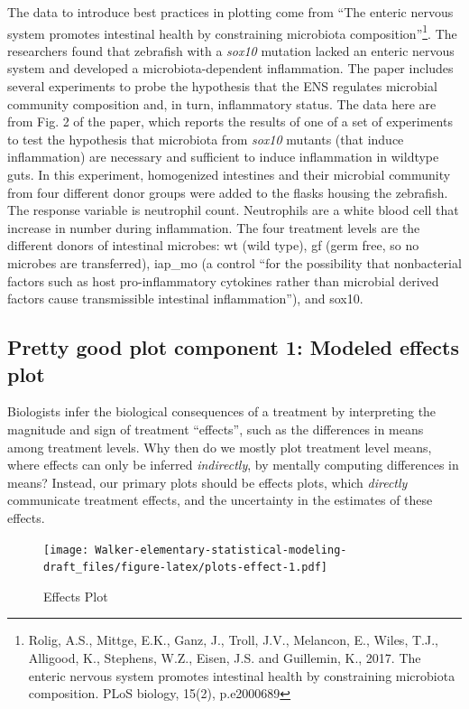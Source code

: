 \documentclass[]{book}
\let\rmarkdownfootnote\footnote%
\def\footnote{\protect\rmarkdownfootnote}
\begin{document}
The data to introduce best practices in plotting come from ``The enteric nervous system promotes intestinal health by constraining microbiota composition''\footnote{Rolig, A.S., Mittge, E.K., Ganz, J., Troll, J.V., Melancon, E., Wiles, T.J., Alligood, K., Stephens, W.Z., Eisen, J.S. and Guillemin, K., 2017. The enteric nervous system promotes intestinal health by constraining microbiota composition. PLoS biology, 15(2), p.e2000689}. The researchers found that zebrafish with a \emph{sox10} mutation lacked an enteric nervous system and developed a microbiota-dependent inflammation. The paper includes several experiments to probe the hypothesis that the ENS regulates microbial community composition and, in turn, inflammatory status. The data here are from Fig. 2 of the paper, which reports the results of one of a set of experiments to test the hypothesis that microbiota from \emph{sox10} mutants (that induce inflammation) are necessary and sufficient to induce inflammation in wildtype guts. In this experiment, homogenized intestines and their microbial community from four different donor groups were added to the flasks housing the zebrafish. The response variable is neutrophil count. Neutrophils are a white blood cell that increase in number during inflammation. The four treatment levels are the different donors of intestinal microbes: wt (wild type), gf (germ free, so no microbes are transferred), iap\_mo (a control ``for the possibility that nonbacterial factors such as host pro-inflammatory cytokines rather than microbial derived factors cause transmissible intestinal inflammation''), and sox10.

\hypertarget{pretty-good-plot-component-1-modeled-effects-plot}{%
\subsection{Pretty good plot component 1: Modeled effects plot}\label{pretty-good-plot-component-1-modeled-effects-plot}}

Biologists infer the biological consequences of a treatment by interpreting the magnitude and sign of treatment ``effects'', such as the differences in means among treatment levels. Why then do we mostly plot treatment level means, where effects can only be inferred \emph{indirectly}, by mentally computing differences in means? Instead, our primary plots should be effects plots, which \emph{directly} communicate treatment effects, and the uncertainty in the estimates of these effects.

\begin{figure}
\centering
\texttt{[image: Walker-elementary-statistical-modeling-draft\_files/figure-latex/plots-effect-1.pdf]}
\caption{\label{fig:plots-effect}Effects Plot}
\end{figure}
\end{document}
